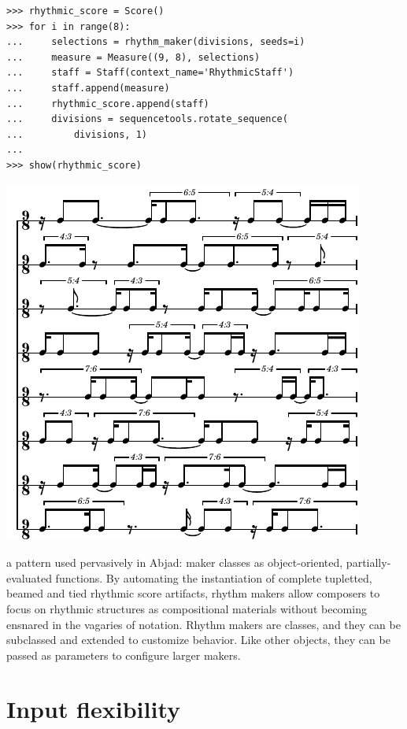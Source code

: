 \documentclass{article}
\begin{document}
\begin{lstlisting}
>>> rhythmic_score = Score()
>>> for i in range(8):
...     selections = rhythm_maker(divisions, seeds=i)
...     measure = Measure((9, 8), selections)
...     staff = Staff(context_name='RhythmicStaff')
...     staff.append(measure)
...     rhythmic_score.append(staff)
...     divisions = sequencetools.rotate_sequence(
...         divisions, 1)
...
>>> show(rhythmic_score)
\end{lstlisting}
\includegraphics{assets/lilypond-89acf493fafea6ee83e3032bbed09718.pdf}

a pattern used pervasively in Abjad: maker classes as
object-oriented, partially-evaluated functions. By automating the instantiation
of complete tupletted, beamed and tied rhythmic score artifacts, rhythm makers
allow composers to focus on rhythmic structures as compositional materials
without becoming ensnared in the vagaries of notation. Rhythm makers are
classes, and they can be subclassed and extended to customize behavior. Like
other objects, they can be passed as parameters to configure larger makers.

\section{Input flexibility} \label{sec:input-flexibility}
\end{document}
